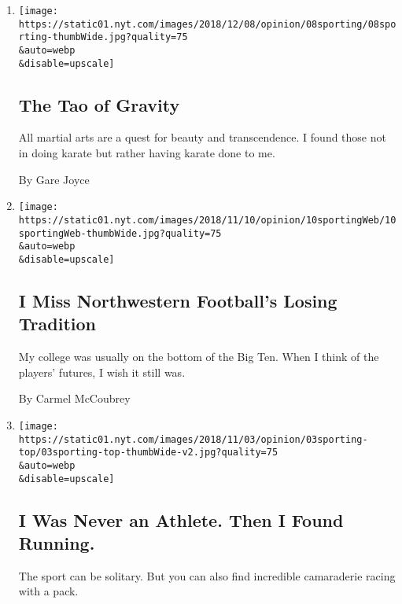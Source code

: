 \begin{enumerate}
\def\labelenumi{\arabic{enumi}.}
\item
  \href{/2018/12/08/opinion/karate-martial-arts-tao-gravity-.html}{}

  \texttt{[image: https://static01.nyt.com/images/2018/12/08/opinion/08sporting/08sporting-thumbWide.jpg?quality=75\\\&auto=webp\\\&disable=upscale]}

  \hypertarget{the-tao-of-gravity}{%
  \subsection{The Tao of Gravity}\label{the-tao-of-gravity}}

  All martial arts are a quest for beauty and transcendence. I found
  those not in doing karate but rather having karate done to me.

  By Gare Joyce
\item
  \href{/2018/11/10/opinion/northwestern-football-big-ten-concussions.html}{}

  \texttt{[image: https://static01.nyt.com/images/2018/11/10/opinion/10sportingWeb/10sportingWeb-thumbWide.jpg?quality=75\\\&auto=webp\\\&disable=upscale]}

  \hypertarget{i-miss-northwestern-footballs-losing-tradition}{%
  \subsection{I Miss Northwestern Football's Losing
  Tradition}\label{i-miss-northwestern-footballs-losing-tradition}}

  My college was usually on the bottom of the Big Ten. When I think of
  the players' futures, I wish it still was.

  By Carmel McCoubrey
\item
  \href{/2018/11/02/opinion/running-marathons-sports.html}{}

  \texttt{[image: https://static01.nyt.com/images/2018/11/03/opinion/03sporting-top/03sporting-top-thumbWide-v2.jpg?quality=75\\\&auto=webp\\\&disable=upscale]}

  \hypertarget{i-was-never-an-athlete-then-i-found-running}{%
  \subsection{I Was Never an Athlete. Then I Found
  Running.}\label{i-was-never-an-athlete-then-i-found-running}}

  The sport can be solitary. But you can also find incredible
  camaraderie racing with a pack.


\end{enumerate}
